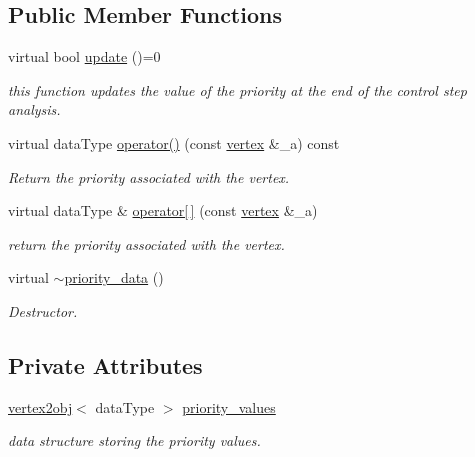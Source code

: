 \subsection*{Public Member Functions}
\begin{DoxyCompactItemize}
\item 
virtual bool \hyperlink{structpriority__data_a3cd70f3b6d8e300615ad91fd85291c76}{update} ()=0
\begin{DoxyCompactList}\small\item\em this function updates the value of the priority at the end of the control step analysis. \end{DoxyCompactList}\item 
virtual data\+Type \hyperlink{structpriority__data_a8bfd788747602771fcd439c49f9d2ae0}{operator()} (const \hyperlink{graph_8hpp_abefdcf0544e601805af44eca032cca14}{vertex} \&\+\_\+a) const
\begin{DoxyCompactList}\small\item\em Return the priority associated with the vertex. \end{DoxyCompactList}\item 
virtual data\+Type \& \hyperlink{structpriority__data_a0fde9994cb5f749b6dbedc1df4be363d}{operator\mbox{[}$\,$\mbox{]}} (const \hyperlink{graph_8hpp_abefdcf0544e601805af44eca032cca14}{vertex} \&\+\_\+a)
\begin{DoxyCompactList}\small\item\em return the priority associated with the vertex. \end{DoxyCompactList}\item 
virtual \hyperlink{structpriority__data_a28acb9d3070e80820cd8ae7ec0c34b04}{$\sim$priority\+\_\+data} ()
\begin{DoxyCompactList}\small\item\em Destructor. \end{DoxyCompactList}\end{DoxyCompactItemize}
\subsection*{Private Attributes}
\begin{DoxyCompactItemize}
\item 
\hyperlink{structvertex2obj}{vertex2obj}$<$ data\+Type $>$ \hyperlink{structpriority__data_a47ac389dee4a6568964c9de2132122a2}{priority\+\_\+values}
\begin{DoxyCompactList}\small\item\em data structure storing the priority values. \end{DoxyCompactList}\end{DoxyCompactItemize}


